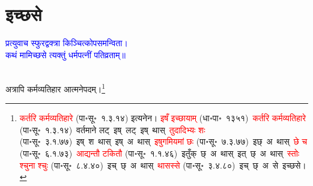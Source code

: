 \section[इच्छसे]{इच्छसे}
\centering\textcolor{blue}{प्रत्युवाच स्फुरद्वक्त्रा किञ्चित्कोपसमन्विता।\nopagebreak\\
कथं मामिच्छसे त्यक्तुं धर्मपत्नीं पतिव्रताम्॥}\nopagebreak\\
\\
\fontsize{14}{21}\selectfont\begin{sloppypar}\justifying\noindent\hspace{10mm} अत्रापि कर्म\-व्यतिहार आत्मनेपदम्।\footnote{\textcolor{red}{कर्तरि कर्मव्यतिहारे} (पा॰सू॰~१.३.१४) इत्यनेन। \textcolor{red}{इषँ इच्छायाम्} (धा॰पा॰~१३५१)~\arrow \textcolor{red}{कर्तरि कर्मव्यतिहारे} (पा॰सू॰~१.३.१४)~\arrow वर्तमाने लट्~\arrow इष्~लट्~\arrow इष्~थास्~\arrow \textcolor{red}{तुदादिभ्यः शः} (पा॰सू॰~३.१.७७)~\arrow इष्~श~थास्~\arrow इष्~अ~थास्~\arrow \textcolor{red}{इषुगमियमां छः} (पा॰सू॰~७.३.७७)~\arrow इछ्~अ~थास्~\arrow \textcolor{red}{छे च} (पा॰सू॰~६.१.७३)~\arrow \textcolor{red}{आद्यन्तौ टकितौ} (पा॰सू॰~१.१.४६)~\arrow इतुँक्~छ्~अ~थास्~\arrow इत्~छ्~अ~थास्~\arrow \textcolor{red}{स्तोः श्चुना श्चुः} (पा॰सू॰~८.४.४०)~\arrow इच्~छ्~अ~थास्~\arrow \textcolor{red}{थासस्से} (पा॰सू॰~३.४.८०)~\arrow इच्~छ्~अ~से~\arrow इच्छसे।}\end{sloppypar}
